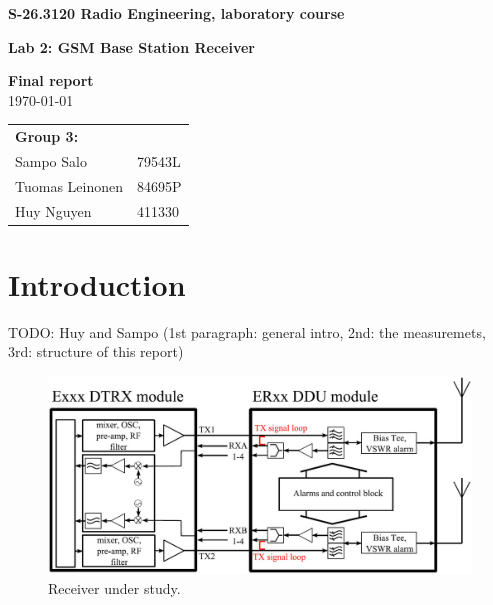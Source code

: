\documentclass[a4paper, 12pt]{article}
\begin{document}
\begin{titlepage}
\pagestyle{empty}
\begin{center}

\vspace*{3cm}
\noindent\LARGE{\textbf{S-26.3120 Radio Engineering, laboratory course}}

\vspace*{2cm}

\Large{\textbf{Lab 2: GSM Base Station Receiver}}\\

\vspace*{1.5cm}

\large{\textbf{Final report}}\\
\vspace{1.5cm}
\large{\today}
	
\vspace*{3cm}
\large{
	\begin{tabular}{l l}
		\textbf{Group 3:} 	& \\
		Sampo Salo			& 79543L	\\
		Tuomas Leinonen 	& 84695P	\\
		Huy Nguyen			& 411330		
	\end{tabular}
}

\end{center}

\end{titlepage}


\section{Introduction}

TODO: Huy and Sampo (1st paragraph: general intro, 2nd: the measuremets, 3rd: structure of this report)


\begin{figure}[h!]
	\begin{center}
	\includegraphics[width=\textwidth]{img/bs.jpg}
	\caption{Receiver under study.}
	\label{f:bs}
	\end{center}
	\vspace*{-12pt}
\end{figure}
\end{document}
